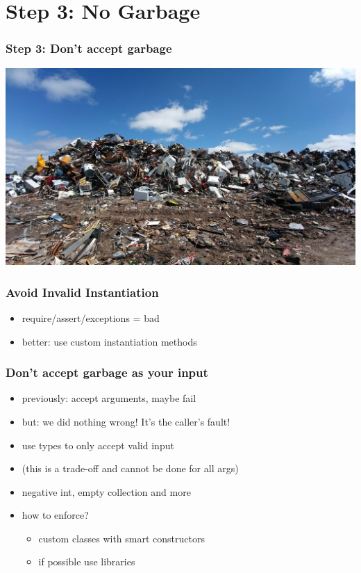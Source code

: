 \documentclass{beamer}
\begin{document}
\section{Step 3: No Garbage}

\begin{frame}
  \frametitle{Step 3: Don't accept garbage}
  \includegraphics[width=\textwidth]{../pics/scrapyard-2441432_1280.jpg}
\end{frame}

\begin{frame}
  \frametitle{Avoid Invalid Instantiation}
  \begin{itemize}
  \item require/assert/exceptions = bad
  \item better: use custom instantiation methods
  \end{itemize}
\end{frame}

\begin{frame}
  \frametitle{Don't accept garbage as your input}
   \begin{itemize}
  \item previously: accept arguments, maybe fail
  \item but: we did nothing wrong!  It's the caller's fault!
  \item use types to only accept valid input
  \item (this is a trade-off and cannot be done for all args)
  \item negative int, empty collection and more
  \item how to enforce?
    \begin{itemize}
    \item custom classes with smart constructors
    \item if possible use libraries
    \end{itemize}
  \end{itemize}
\end{frame}
\end{document}
